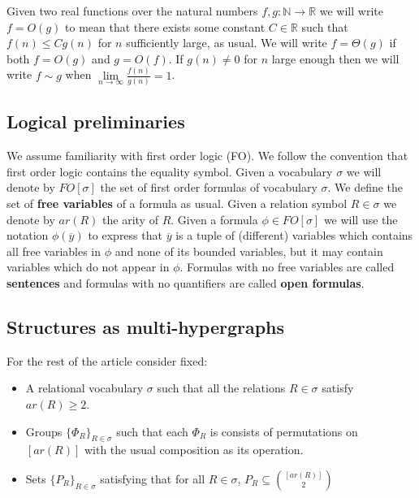 \documentclass[12pt,notitlepage,a4paper]{article}
\theoremstyle{definition}
\newcommand{\R}{\mathbb{R}}
\newcommand{\N}{\mathbb{N}}
\newcommand{\Ln}{\lim\limits_{n\to \infty}}
\begin{document}
Given two real functions over the natural numbers 
$f,g:\N \rightarrow \R$ we will write $f=O(g)$ to 
mean that there exists some constant $C\in \R$
such that $f(n)\leq Cg(n)$ for $n$ sufficiently large, 
as usual. We will write $f=\Theta(g)$ if both $f=O(g)$ and
$g=O(f)$. If $g(n)\neq 0$ for $n$ large enough then
we will write $f\sim g$ when $\Ln \frac{f(n)}{g(n)}=1$. 

%


\subsection{Logical preliminaries}
We assume familiarity with first order logic (FO). We follow 
the convention that first order logic contains the equality symbol. 
Given a vocabulary $\sigma$ we will denote by $FO[\sigma]$ the set of 
first order formulas of vocabulary $\sigma$. We define the set of 
\textbf{free variables} of a formula as usual. 
Given a relation symbol $R\in \sigma$ we denote by $ar(R)$ the arity of $R$. 
Given a formula $\phi\in FO[\sigma]$ we will use the notation $\phi(\overline{y})$ 
to express that $\overline{y}$ is a tuple of 
(different) variables which contains all free variables in $\phi$ and
none of its bounded variables, but it may contain variables
which do not appear in $\phi$.
Formulas with no free variables are called \textbf{sentences} and 
formulas with no quantifiers are called \textbf{open formulas}. 


\subsection{Structures as multi-hypergraphs} \label{sect:structures}

For the rest of the article consider fixed:
\begin{itemize}
	\item A relational vocabulary $\sigma$ such 
	that all the relations $R\in\sigma$ satisfy $ar(R)\geq 2$. 
	\item 
	Groups $\{ \Phi_R \}_{R\in \sigma}$
	such that each $\Phi_R$ is consists of 
	permutations on $[ar(R)]$ with the usual 
	composition as its operation.	
	\item 
	Sets $\{P_R\}_{R\in \sigma}$ satisfying that for 
	all $R\in \sigma$, 
	$P_R\subseteq \binom{[ar(R)]}{2}$
	
	
\end{itemize}
%
\end{document}
